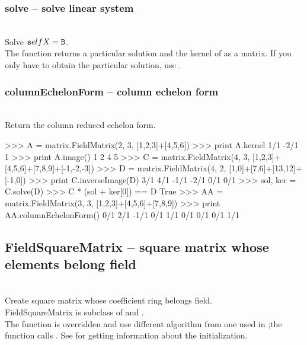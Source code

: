   \subsubsection{solve -- solve linear system}
   \\
   \spacing
   \quad Solve ${\texttt self}X = {\texttt B}$.\\
   \spacing
   \quad The function returns a particular solution  and the kernel of  as a matrix.
   If you only have to obtain the particular solution, use .
   \spacing
  \subsubsection{columnEchelonForm -- column echelon form}
   \\
   \quad Return the column reduced echelon form.\\
   \spacing
\begin{ex}
>>> A = matrix.FieldMatrix(2, 3, [1,2,3]+[4,5,6])
>>> print A.kernel
 1/1
-2/1
   1
>>> print A.image()
1 2
4 5
>>> C = matrix.FieldMatrix(4, 3, [1,2,3]+[4,5,6]+[7,8,9]+[-1,-2,-3])
>>> D = matrix.FieldMatrix(4, 2, [1,0]+[7,6]+[13,12]+[-1,0])
>>> print C.inverseImage(D)
 3/1  4/1
-1/1 -2/1
 0/1  0/1
>>> sol, ker = C.solve(D)
>>> C * (sol + ker[0]) == D
True
>>> AA = matrix.FieldMatrix(3, 3, [1,2,3]+[4,5,6]+[7,8,9])
>>> print AA.columnEchelonForm()
0/1 2/1 -1/1
0/1 1/1  0/1
0/1 0/1  1/1
\end{ex}
\C

\subsection{FieldSquareMatrix -- square matrix whose elements belong field}
  \\
  \spacing
  \quad Create square matrix whose coefficient ring belongs field.\\
  \spacing
  \quad FieldSquareMatrix is subclass of  and .\\
  \negok The function  is overridden and use different algorithm from one used in ;the function calls .
  See  for getting information about the initialization.\\
  \spacing
 \method
